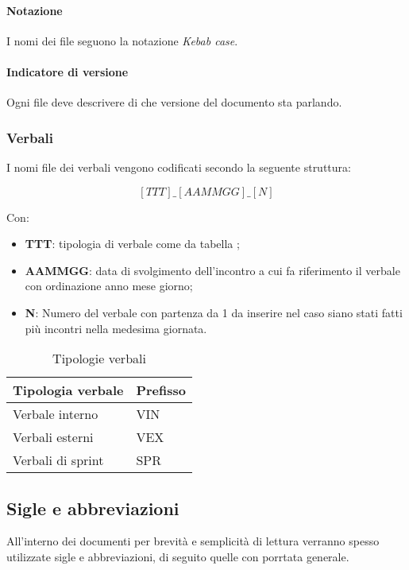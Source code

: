 \paragraph{Notazione}I nomi dei file seguono la notazione \textit{Kebab case}.

\paragraph{Indicatore di versione}Ogni file deve descrivere di che versione del documento sta parlando.



\subsubsection{Verbali}
I nomi file dei verbali vengono codificati secondo la seguente struttura:

\[[TTT]\_[AAMMGG]\_[N]\]

Con:
\begin{itemize}
    \item \textbf{TTT}: tipologia di verbale come da tabella  ;
    \item \textbf{AAMMGG}: data di svolgimento dell'incontro a cui fa riferimento il verbale con ordinazione anno mese giorno;
    \item \textbf{N}: Numero del verbale con partenza da 1 da inserire nel caso siano stati fatti più incontri nella medesima giornata.
\end{itemize}

\begin{table}[h]
    \centering
    \begin{tabularx}{0.7\linewidth}{X | l}
        \textbf{Tipologia verbale} & \textbf{Prefisso}\\
        \hline
        Verbale interno & VIN \\
        Verbali esterni & VEX\\
        Verbali di sprint & SPR \\
    \end{tabularx}
    \caption{Tipologie verbali}
    \label{table:t_verbali}
\end{table}



\subsection{Sigle e abbreviazioni}

All'interno dei documenti per brevità e semplicità di lettura verranno spesso utilizzate sigle e abbreviazioni, di seguito quelle con porrtata generale.

